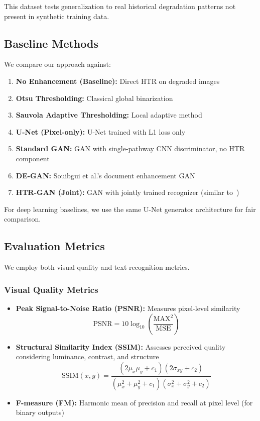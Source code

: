 \documentclass[journal]{IEEEtran}
\begin{document}
This dataset tests generalization to real historical degradation patterns not present in synthetic training data.

\subsection{Baseline Methods}

We compare our approach against:

\begin{enumerate}
    \item \textbf{No Enhancement (Baseline):} Direct HTR on degraded images
    \item \textbf{Otsu Thresholding:} Classical global binarization
    \item \textbf{Sauvola Adaptive Thresholding:} Local adaptive method
    \item \textbf{U-Net (Pixel-only):} U-Net trained with L1 loss only
    \item \textbf{Standard GAN:} GAN with single-pathway CNN discriminator, no HTR component
    \item \textbf{DE-GAN:} Souibgui et al.'s document enhancement GAN~\cite{souibgui2020degan}
    \item \textbf{HTR-GAN (Joint):} GAN with jointly trained recognizer (similar to~\cite{souibgui2021enhance})
\end{enumerate}

For deep learning baselines, we use the same U-Net generator architecture for fair comparison.

\subsection{Evaluation Metrics}

We employ both visual quality and text recognition metrics.

\subsubsection{Visual Quality Metrics}

\begin{itemize}
    \item \textbf{Peak Signal-to-Noise Ratio (PSNR):} Measures pixel-level similarity
    \begin{equation}
    \text{PSNR} = 10 \log_{10}\left(\frac{\text{MAX}^2}{\text{MSE}}\right)
    \end{equation}
    
    \item \textbf{Structural Similarity Index (SSIM):} Assesses perceived quality considering luminance, contrast, and structure~\cite{wang2004ssim}
    \begin{equation}
    \text{SSIM}(x,y) = \frac{(2\mu_x\mu_y + c_1)(2\sigma_{xy} + c_2)}{(\mu_x^2 + \mu_y^2 + c_1)(\sigma_x^2 + \sigma_y^2 + c_2)}
    \end{equation}
    
    \item \textbf{F-measure (FM):} Harmonic mean of precision and recall at pixel level (for binary outputs)
\end{itemize}
\end{document}
